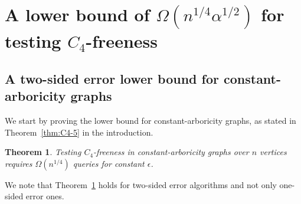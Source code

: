 \documentclass{article}
\newcommand{\eps}{\epsilon}
\newtheorem{theorem}{Theorem}
\newcommand{\commentt}[1]{ {}}
\begin{document}
\section{A lower bound of $\Omega(n^{1/4}\alpha^{1/2})$ for testing $C_4$-freeness}\label{sec:C4-lb}

\subsection{A two-sided error lower bound for constant-arboricity graphs}
We start by proving the lower bound for constant-arboricity graphs, as stated in Theorem~\ref{thm:C4-5} in the introduction.

\begin{theorem} \label{thm:C4-const-alpha-lb}
Testing $C_4$-freeness in constant-arboricity graphs over $n$ vertices requires $\Omega(n^{1/4})$ queries for constant $\epsilon$.
\end{theorem}
We note that Theorem~\ref{thm:C4-const-alpha-lb} holds for two-sided error algorithms and not only one-sided error ones.
\end{document}
